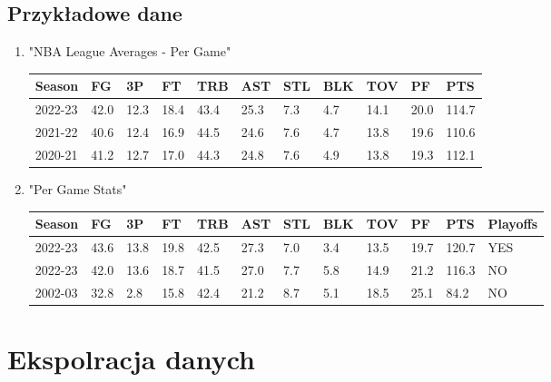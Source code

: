 \documentclass{article}
\begin{document}
\subsection{Przykładowe dane}
\begin{enumerate}
    \item "NBA League Averages - Per Game"
        \begin{table}[H]
            \centering
            \begin{tabular}{|l|l|l|l|l|l|l|l|l|l|l|}
            \hline
            \textbf{Season} & \textbf{FG} & \textbf{3P} & \textbf{FT} & \textbf{TRB} & \textbf{AST} & \textbf{STL} & \textbf{BLK} & \textbf{TOV} & \textbf{PF} & \textbf{PTS} \\ \hline
            2022-23 & 42.0 & 12.3 & 18.4 & 43.4 & 25.3 & 7.3 & 4.7 & 14.1 & 20.0 & 114.7 \\ \hline
            2021-22 & 40.6 & 12.4 & 16.9 & 44.5 & 24.6 & 7.6 & 4.7 & 13.8 & 19.6 & 110.6 \\ \hline
            2020-21 & 41.2 & 12.7 & 17.0 & 44.3 & 24.8 & 7.6 & 4.9 & 13.8 & 19.3 & 112.1 \\ \hline
            \end{tabular}
        \end{table}
    \item "Per Game Stats"
        \begin{table}[H]
            \centering
            \begin{tabular}{|l|l|l|l|l|l|l|l|l|l|l|l|}
            \hline
            \textbf{Season} & \textbf{FG} & \textbf{3P} & \textbf{FT} & \textbf{TRB} & \textbf{AST} & \textbf{STL} & \textbf{BLK} & \textbf{TOV} & \textbf{PF} & \textbf{PTS} & \textbf{Playoffs} \\ \hline
            2022-23 & 43.6 & 13.8 & 19.8 & 42.5 & 27.3 & 7.0 & 3.4 & 13.5 & 19.7 & 120.7 & YES \\ \hline
            2022-23 & 42.0 & 13.6 & 18.7 & 41.5 & 27.0 & 7.7 & 5.8 & 14.9 & 21.2 & 116.3 & NO \\ \hline
            2002-03 & 32.8 & 2.8 & 15.8 & 42.4 & 21.2 & 8.7 & 5.1 & 18.5 & 25.1 & 84.2 & NO \\ \hline
            \end{tabular}
        \end{table}
\end{enumerate}

\newpage

\section{Ekspolracja danych}
\end{document}
